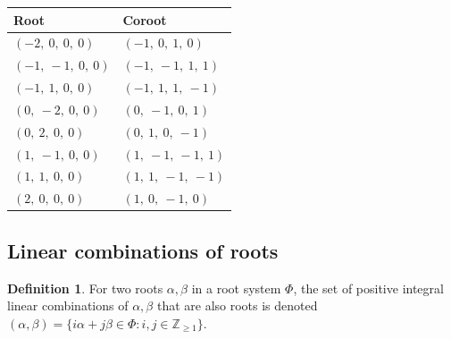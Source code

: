 \documentclass[11pt]{article}
\theoremstyle{definition}
\newtheorem{definition}{Definition}[section]
\begin{document}
\begin{tabular}{|l|l|}
    \hline
    \textbf{Root} & \textbf{Coroot} \\
    \hline
    $\left( -2, \  0, \  0, \  0\right)$ & $\left( -1, \  0, \  1, \  0\right)$ \\
    \hline
    $\left( -1, \  -1, \  0, \  0\right)$ & $\left( -1, \  -1, \  1, \  1\right)$ \\
    \hline
    $\left( -1, \  1, \  0, \  0\right)$ & $\left( -1, \  1, \  1, \  -1\right)$ \\
    \hline
    $\left( 0, \  -2, \  0, \  0\right)$ & $\left( 0, \  -1, \  0, \  1\right)$ \\
    \hline
    $\left( 0, \  2, \  0, \  0\right)$ & $\left( 0, \  1, \  0, \  -1\right)$ \\
    \hline
    $\left( 1, \  -1, \  0, \  0\right)$ & $\left( 1, \  -1, \  -1, \  1\right)$ \\
    \hline
    $\left( 1, \  1, \  0, \  0\right)$ & $\left( 1, \  1, \  -1, \  -1\right)$ \\
    \hline
    $\left( 2, \  0, \  0, \  0\right)$ & $\left( 1, \  0, \  -1, \  0\right)$ \\
    \hline
\end{tabular}


\subsection{Linear combinations of roots}

\begin{definition}
For two roots $\alpha, \beta$ in a root system $\Phi$, the set of positive integral linear combinations of $\alpha, \beta$ that are also roots is denoted
\(
	(\alpha, \beta) = \{ i \alpha + j \beta \in \Phi : i, j \in \mathbb{Z}_{\ge 1} \}
\).
\end{definition}
\end{document}

